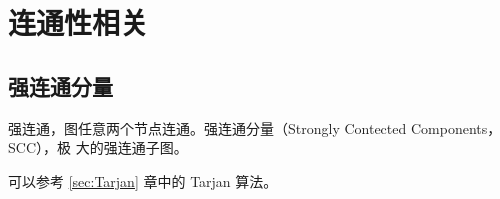 \section{连通性相关} \label{sec:连通性相关}
\subsection{强连通分量}
强连通，图任意两个节点连通。强连通分量（Strongly Contected Components，SCC），极
大的强连通子图。

可以参考 \ref{sec:Tarjan} 章中的 Tarjan 算法。
